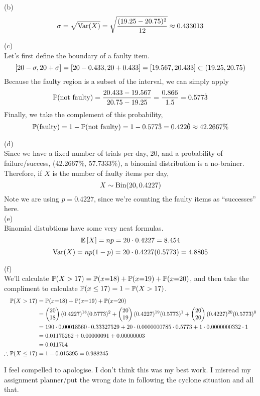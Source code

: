 \documentclass[a4paper,12pt]{report}
\begin{document}
\sol (b) \\
$$
  \sigma = \sqrt{\operatorname{Var}(X)} = \sqrt{\frac{(19.25 - 20.75)^2}{12}} \approx 0.433013
$$

\newpage
\sol(c) \\
Let's first define the boundary of a faulty item.
$$
  \left[ 20 - \sigma, 20 + \sigma \right] = \left[ 20 - 0.433, 20 + 0.433 \right] = \left[ 19.567, 20.433 \right] \subset (19.25, 20.75)
$$
Because the faulty region is a subset of the interval, we can simply apply
$$
  \mathbb{P}(\text{not faulty}) = \frac{20.433 - 19.567}{20.75 - 19.25} = \frac{0.866}{1.5} = 0.577\dot{3}
$$
Finally, we take the complement of this probability,
$$
  \mathbb{P}(\text{faulty}) = 1 - \mathbb{P}(\text{not faulty}) = 1 - 0.577\dot{3} = 0.422\dot{6} \approx 42.2667\%
$$

\sol(d) \\
Since we have a fixed number of trials per day, 20, and a probability of failure/success, (42.2667\%, 57.7333\%), a binomial distribution is a no-brainer. Therefore, if $X$ is the number of faulty items per day,
$$
  X\sim \operatorname{Bin}(20, 0.4227)
$$
Note we are using $p=0.4227$, since we're counting the faulty items as ``successes'' here. \\

\sol(e) \\
Binomial distubtions have some very neat formulas.
$$
  \mathbb{E}\left[ X \right] = np = 20 \cdot 0.4227 = 8.454
$$
$$
  \operatorname{Var}(X) = np(1-p) = 20\cdot0.4227(0.5773) = 4.8805
$$

\sol(f) \\
We'll calculate $\mathbb{P}(X>17) = \mathbb{P}(x{=}18)+\mathbb{P}(x{=}19)+\mathbb{P}(x{=}20)$, and then take the compliment to calculate $\mathbb{P}(x\leq 17) = 1 - \mathbb{P}(X>17)$.
\begin{align*}
  \mathbb{P}(X>17) &= \mathbb{P}(x{=}18)+\mathbb{P}(x{=}19)+\mathbb{P}(x{=}20) \\
    &= \begin{pmatrix} 20 \\ 18 \end{pmatrix}(0.4227)^{18}(0.5773)^2 + \begin{pmatrix} 20 \\ 19 \end{pmatrix}(0.4227)^{19}(0.5773)^1 + \begin{pmatrix} 20 \\ 20 \end{pmatrix}(0.4227)^{20}(0.5773)^0 \\
    &= 190\cdot0.00018560\cdot 0.33327529 + 20\cdot0.0000000785\cdot0.5773 +  1\cdot0.0000000332\cdot1\\
    &= 0.01175262 + 0.00000091 + 0.00000003 \\
    &= 0.011754 \\
  \therefore\mathbb{P}(X\leq17) &= 1 - 0.015395 = 0.988245
\end{align*}

\newpage
I feel compelled to apologise. I don't think this was my best work. I misread my assignment planner/put the wrong date in following the cyclone situation and all that. \\
\end{document}
